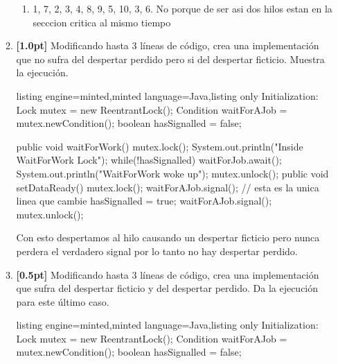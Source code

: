 \documentclass[a4paper,11pt]{article}
\begin{document}
\begin{enumerate}
\begin{enumerate}
\begin{enumerate}
                            \item 1, 7, 2, 3, 4, 8, 9, 5, 10, 3, 6. 
                            No porque de ser asi dos hilos estan en la secccion critica al mismo tiempo
                        \end{enumerate}
                
                \item
                    \textbf{[1.0pt]} Modificando hasta 3 líneas de código, crea una implementación que no 
                    sufra del despertar perdido pero si del despertar ficticio. Muestra la ejecución.

                    \begin{tcblisting}{listing engine=minted,minted language=Java,listing only}
                        Initialization:
                        Lock mutex = new ReentrantLock();
                        Condition waitForAJob = mutex.newCondition();
                        boolean hasSignalled = false;
                            
                        public void waitForWork() {
                          mutex.lock();
                          System.out.println("Inside WaitForWork Lock");
                          while(!hasSignalled) {
                            waitForJob.await();
                            System.out.println("WaitForWork woke up");
                          }
                          mutex.unlock();
                        }
                        public void setDataReady() {
                            mutex.lock();
                            waitForAJob.signal(); // esta es la unica linea que cambie
                            hasSignalled = true;
                            waitForAJob.signal();
                            mutex.unlock();
                        }
                    \end{tcblisting}

                    Con esto despertamos al hilo causando un despertar ficticio pero nunca perdera el verdadero signal
                    por lo tanto no hay despertar perdido.

                \item
                    \textbf{[0.5pt]} Modificando hasta 3 líneas de código, crea una implementación que sufra del
                     despertar ficticio y del despertar perdido. Da la ejecución para este último caso.

                    \begin{tcblisting}{listing engine=minted,minted language=Java,listing only}
                        Initialization:
                        Lock mutex = new ReentrantLock();
                        Condition waitForAJob = mutex.newCondition();
                        boolean hasSignalled = false;
                            

\end{tcblisting}
\end{enumerate}
\end{enumerate}
\end{document}
